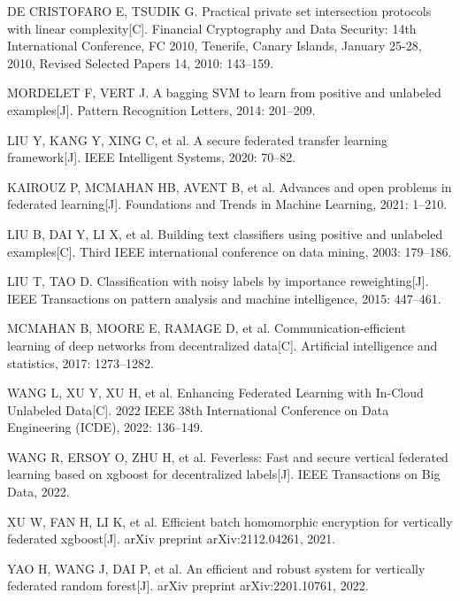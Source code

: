 \begin{thebibliography}{200}
	DE CRISTOFARO E, TSUDIK G. Practical private set intersection protocols with linear complexity[C]. Financial Cryptography and Data Security: 14th International Conference, FC 2010, Tenerife, Canary Islands, January 25-28, 2010, Revised Selected Papers 14, 2010: 143--159.
	
	MORDELET F, VERT J. A bagging SVM to learn from positive and unlabeled examples[J]. Pattern Recognition Letters, 2014: 201--209.
	
	LIU Y, KANG Y, XING C, et al. A secure federated transfer learning framework[J]. IEEE Intelligent Systems, 2020: 70--82.
	
	KAIROUZ P, MCMAHAN HB, AVENT B, et al. Advances and open problems in federated learning[J]. Foundations and Trends{\textregistered} in Machine Learning, 2021: 1--210.
	
	LIU B, DAI Y, LI X, et al. Building text classifiers using positive and unlabeled examples[C]. Third IEEE international conference on data mining, 2003: 179--186.
	
	LIU T, TAO D. Classification with noisy labels by importance reweighting[J]. IEEE Transactions on pattern analysis and machine intelligence, 2015: 447--461.
	
	MCMAHAN B, MOORE E, RAMAGE D, et al. Communication-efficient learning of deep networks from decentralized data[C]. Artificial intelligence and statistics, 2017: 1273--1282.
	
	WANG L, XU Y, XU H, et al. Enhancing Federated Learning with In-Cloud Unlabeled Data[C]. 2022 IEEE 38th International Conference on Data Engineering (ICDE), 2022: 136--149.
	
	WANG R, ERSOY O, ZHU H, et al. Feverless: Fast and secure vertical federated learning based on xgboost for decentralized labels[J]. IEEE Transactions on Big Data, 2022.
	
	XU W, FAN H, LI K, et al. Efficient batch homomorphic encryption for vertically federated xgboost[J]. arXiv preprint arXiv:2112.04261, 2021.
	
	YAO H, WANG J, DAI P, et al. An efficient and robust system for vertically federated random forest[J]. arXiv preprint arXiv:2201.10761, 2022.
	

\end{thebibliography}
